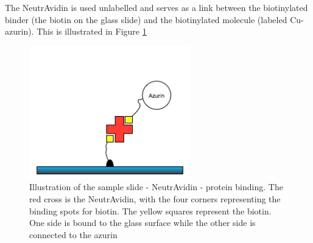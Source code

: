\documentclass[twoside,single]{lion-msc}
\begin{document}
The NeutrAvidin is used unlabelled and serves as a link between the biotinylated binder (the biotin on the glass slide) and the biotinylated molecule (labeled Cu-azurin). This is illustrated in Figure \ref{avadinbinding} 

\begin{figure}[ht!]
\centering
\includegraphics[width=70mm]{avadin}
\caption{Illustration of the sample slide - NeutrAvidin - protein binding. The red cross is the NeutrAvidin, with the four corners representing the binding spots for biotin. The yellow squares represent the biotin. One side is bound to the glass surface while the other side is connected to the azurin}
\label{avadinbinding}
\end{figure}
\end{document}
